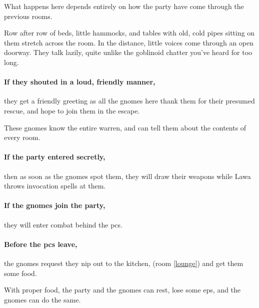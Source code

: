 \begin{multicols}{2}
What happens here depends entirely on how the party have come through the previous rooms.

\begin{boxtext}
  Row after row of beds, little hammocks, and tables with old, cold pipes sitting on them stretch across the room.
  In the distance, little voices come through an open doorway.
  They talk lazily, quite unlike the goblinoid chatter you've heard for too long.
\end{boxtext}

\paragraph{If they shouted in a loud, friendly manner,}
they get a friendly greeting as all the gnomes here thank them for their presumed rescue, and hope to join them in the escape.

These gnomes know the entire \gls{warren}, and can tell them about the contents of every room.

\paragraph{If the party entered secretly,}
then as soon as the gnomes spot them, they will draw their weapons while Lawa throws invocation spells at them.

\paragraph{If the gnomes join the party,}
they will enter combat behind the \glspl{pc}.

\paragraph{Before the \glspl{pc} leave,}
the gnomes request they nip out to the kitchen, (room \ref{lounge}) and get them some food.

With proper food, the party and the gnomes can rest, lose some \glspl{ep}, and the gnomes can do the same.


\showStdSpells



\Yan



\end{multicols}
